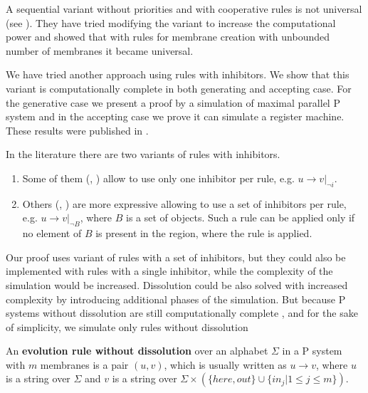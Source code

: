  A sequential variant without priorities and with cooperative rules is not universal (see \cite{Ibarra04dang}). They have tried modifying the variant to increase the computational power and showed that with rules for membrane creation with unbounded number of membranes it became universal.

We have tried another approach using rules with inhibitors. We show that this variant is computationally complete in both generating and accepting case. For the generative case we present a proof by a simulation of maximal parallel P system and in the accepting case we prove it can simulate a register machine. These results were published in \cite{Kovac14Inhibitors}.

In the literature there are two variants of  rules with inhibitors.
\begin{enumerate}
  \item Some of them (\cite{Ionescu:jucs_10_5:on_p_systems_with}, \cite{Sburlan05dragos}) allow to use only one inhibitor per rule, e.g. $u\rightarrow v|_{\neg i}$.
  \item Others (\cite{Agrigoroaiei:2010:Dissolution}, \cite{Sburlan:2006:FurtherResultsPromotersInhibitors}) are more expressive allowing to use a set of inhibitors per rule, e.g. $u\rightarrow v|_{\neg B}$, where $B$ is a set of objects. Such a rule can be applied only if no element of $B$ is present in the region, where the rule is applied.
\end{enumerate}

Our proof uses variant of rules with a set of inhibitors, but they could also be implemented with rules with a single inhibitor, while the complexity of the simulation would be increased.
Dissolution could be also solved with increased complexity by introducing additional phases of the simulation. But because P systems without dissolution are still computationally complete \cite{Agrigoroaiei:2010:Dissolution}, and for the sake of simplicity, we simulate only rules without dissolution 

\begin{definition}
\label{def:evolution_rule_without_dissolution}
  An {\bf evolution rule without dissolution} over an alphabet $\Sigma$ in a P system with $m$ membranes is a pair $(u,v)$, which is usually written as $u\rightarrow v$, where $u$ is a string over $\Sigma$ and $v$ is a string over $\Sigma\times(\{here, out\}\cup\{in_j|1\leq j\leq m\})$.
\end{definition}

